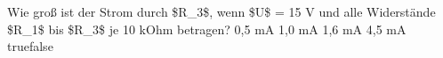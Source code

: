     {Wie groß ist der Strom durch \$R\_3\$, wenn \$U\$ = 15 V und alle Widerstände \$R\_1\$ bis \$R\_3\$ je 10 kOhm betragen?}
    {0,5 mA}
    {1,0 mA}
    {1,6 mA}
    {4,5 mA}
    {true}{false}
